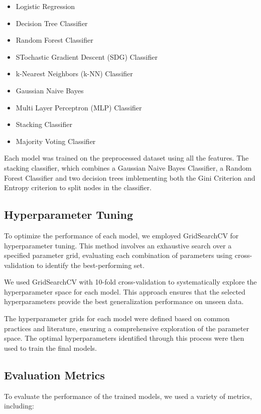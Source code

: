 \documentclass{Configuration_Files/Template}
\begin{document}
\begin{itemize}
    \item Logistic Regression
    \item Decision Tree Classifier
    \item Random Forest Classifier
    \item STochastic Gradient Descent (SDG) Classifier
    \item k-Nearest Neighbors (k-NN) Classifier
    \item Gaussian Naive Bayes
    \item Multi Layer Perceptron (MLP) Classifier 
    \item Stacking Classifier
    \item Majority Voting Classifier
\end{itemize}

Each model was trained on the preprocessed dataset using all the features. The stacking classifier, which combines a Gaussian Naive Bayes Classifier, a Random Forest Classifier and two decision trees imblementing both the Gini Criterion and Entropy criterion to split nodes in the classifier.

\subsection{Hyperparameter Tuning}
To optimize the performance of each model, we employed GridSearchCV for hyperparameter tuning. This method involves an exhaustive search over a specified parameter grid, evaluating each combination of parameters using cross-validation to identify the best-performing set.


We used GridSearchCV with 10-fold cross-validation to systematically explore the hyperparameter space for each model. This approach ensures that the selected hyperparameters provide the best generalization performance on unseen data.


The hyperparameter grids for each model were defined based on common practices and literature, ensuring a comprehensive exploration of the parameter space. The optimal hyperparameters identified through this process were then used to train the final models.

\subsection{Evaluation Metrics}
To evaluate the performance of the trained models, we used a variety of metrics, including:
\end{document}
